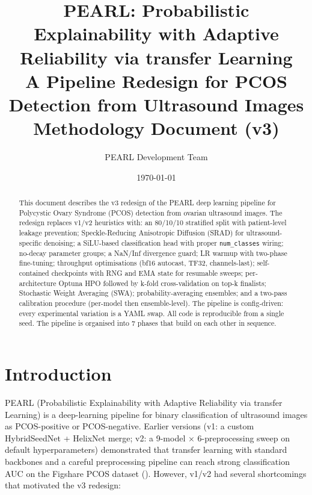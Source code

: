 \documentclass[10pt,a4paper]{article}
\title{\textbf{PEARL: Probabilistic Explainability with Adaptive\\
  Reliability via transfer Learning}\\[0.4em]
  \large A Pipeline Redesign for PCOS Detection from Ultrasound Images\\[0.6em]
  \normalsize Methodology Document (v3)}
\author{PEARL Development Team}
\date{\today}
\begin{document}
\maketitle

\begin{abstract}
\noindent
This document describes the v3 redesign of the PEARL deep learning
pipeline for Polycystic Ovary Syndrome (PCOS) detection from ovarian
ultrasound images. The redesign replaces v1/v2 heuristics with: an
80/10/10 stratified split with patient-level leakage prevention;
Speckle-Reducing Anisotropic Diffusion (SRAD) for ultrasound-specific
denoising; a SiLU-based classification head with proper
\texttt{num\_classes} wiring; no-decay parameter groups; a NaN/Inf
divergence guard; LR warmup with two-phase fine-tuning; throughput
optimisations (bf16 autocast, TF32, channels-last); self-contained
checkpoints with RNG and EMA state for resumable sweeps; per-architecture
Optuna HPO followed by k-fold cross-validation on top-k finalists;
Stochastic Weight Averaging (SWA); probability-averaging ensembles;
and a two-pass calibration procedure (per-model then ensemble-level).
The pipeline is config-driven: every experimental variation is a YAML
swap. All code is reproducible from a single seed. The pipeline is
organised into 7 phases that build on each other in sequence.
\end{abstract}

\tableofcontents

\section{Introduction}

PEARL (Probabilistic Explainability with Adaptive Reliability via
transfer Learning) is a deep-learning pipeline for binary
classification of ultrasound images as PCOS-positive or
PCOS-negative. Earlier versions (v1: a custom HybridSeedNet + HelixNet
merge; v2: a 9-model × 6-preprocessing sweep on default
hyperparameters) demonstrated that transfer learning with standard
backbones and a careful preprocessing pipeline can reach strong
classification AUC on the Figshare PCOS dataset
(\cite{figshare:pcos}). However, v1/v2 had several shortcomings that
motivated the v3 redesign:
\end{document}
